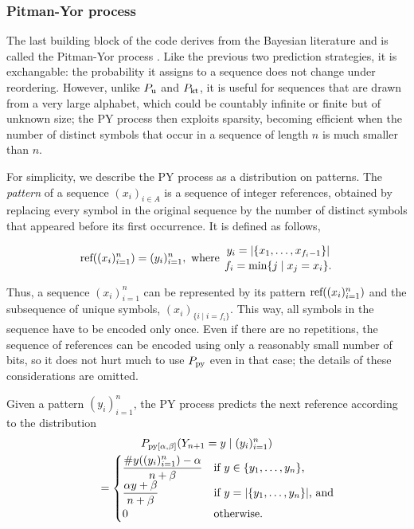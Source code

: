 \subsubsection{Pitman-Yor process}
The last building block of the code derives from the Bayesian
literature and is called the Pitman-Yor process \cite{pitman1997}. Like the
previous two prediction strategies, it is exchangable: the probability
it assigns to a sequence does not change under reordering. However,
unlike $P_\textnormal{u}$ and $P_\textnormal{kt}$, it is useful for sequences that are
drawn from a very large alphabet, which could be countably infinite or
finite but of unknown size; the PY process then exploits sparsity,
becoming efficient when the number of distinct symbols that occur in a
sequence of length $n$ is much smaller than $n$.

For simplicity, we describe the PY process as a distribution on
patterns. The \emph{pattern} of a sequence $(x_i)_{i\in A}$ is a
sequence of integer references, obtained by replacing every symbol in
the original sequence by the number of distinct symbols that appeared
before its first occurrence. It is defined as follows,

\[
\textnormal{ref}((x_i)_{i=1}^n)=(y_i)_{i=1}^n,\textnormal{~where~} 
{y_i=|\{x_1,\ldots,x_{f_i-1}\}| \atop f_i=\min\{j\mid x_j=x_i\}.}
\]

Thus, a sequence $(x_i)_{i=1}^n$ can be represented by its pattern
$\textnormal{ref}((x_i)_{i=1}^n)$ and the subsequence of unique symbols,
$(x_i)_{\{i\mid i=f_i\}}$. This way, all symbols in the sequence have
to be encoded only once. Even if there are no repetitions, the
sequence of references can be encoded using only a reasonably small
number of bits, so it does not hurt much to use $P_\textnormal{py}$ even in
that case; the details of these considerations are omitted.

Given a pattern $(y_i)_{i=1}^n$, the PY process predicts the next
reference according to the distribution
\begin{multline*}
P_{\textnormal{py}[\alpha,\beta]}(Y_{n+1}=y\mid (y_i)_{i=1}^n)\\
\qquad=\begin{cases}
\displaystyle\frac{\#y((y_i)_{i=1}^n)-\alpha}{n+\beta}&\textnormal{if $y\in\{y_1,\ldots,y_n\}$,}\\
\displaystyle\frac{\alpha y+\beta}{n+\beta}&\textnormal{if $y=|\{y_1,\ldots,y_n\}|$, and}\\
0&\textnormal{otherwise}.
\end{cases}\end{multline*}

